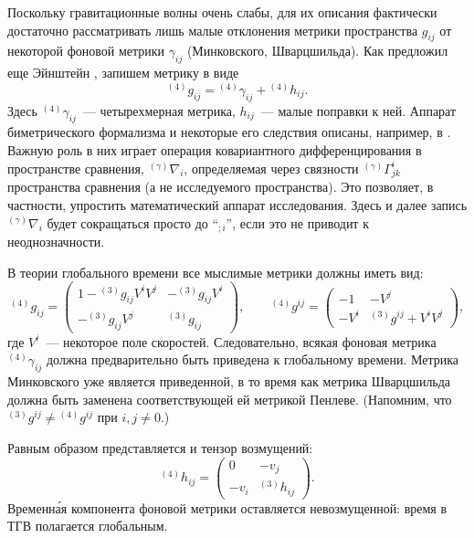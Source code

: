 \documentclass[\docroot/reports/draft/report.tex]{subfiles}
\begin{document}
    Поскольку гравитационные волны очень слабы, для их описания фактически достаточно рассматривать лишь малые отклонения метрики пространства $g_{ij}$ от некоторой фоновой метрики $\gamma_{ij}$ (Минковского, Шварцшильда). Как предложил еще Эйнштейн \cite{einstein_grav_waves}, запишем метрику в виде
    \begin{equation}\label{eq:gab}
        {}^{(4)}g_{ij} = {}^{(4)}\gamma_{ij} + {}^{(4)}h_{ij} .
    \end{equation}
    Здесь ${}^{(4)}\gamma_{ij}$~--- четырехмерная метрика, $h_{ij}$~--- малые поправки к ней. Аппарат биметрического формализма и некоторые его следствия описаны, например, в \cite{burlankov_jetp_covar_cosn}. Важную роль в них играет операция ковариантного дифференцирования в пространстве сравнения, ${}^{(\gamma)}\nabla_i$, определяемая через связности ${}^{(\gamma)}\Gamma^i_{jk}$ пространства сравнения (а не исследуемого пространства). Это позволяет, в частности, упростить математический аппарат исследования. Здесь и далее запись ${}^{(\gamma)}\nabla_i$ будет сокращаться просто до \enquote{${}_{;i}$}, если это не приводит к неоднозначности.

    В теории глобального времени все мыслимые метрики должны иметь вид:
    \begin{equation}
        {}^{(4)}g_{ij} = \begin{pmatrix}
            1 - {}^{(3)}g_{ij} V^i V^j   & - {}^{(3)}g_{ij} V^i \\
            - {}^{(3)}g_{ij} V^j         & {}^{(3)}g_{ij}
        \end{pmatrix} , \qquad
        {}^{(4)}g^{ij} = \begin{pmatrix}
            - 1   & - V^j                           \\
            - V^i & {}^{(3)}g^{ij} + V^i V^j
        \end{pmatrix} ,
    \end{equation}
    где $V^i$~--- некоторое поле скоростей. Следовательно, всякая фоновая метрика  ${}^{(4)}\gamma_{ij}$ должна предварительно быть приведена к глобальному времени. Метрика Минковского уже является приведенной, в то время как метрика Шварцшильда должна быть заменена соответствующей ей метрикой Пенлеве. (Напомним, что ${}^{(3)}g^{ij} \neq {}^{(4)}g^{ij}$ при $i,j \neq 0$.)

    Равным образом представляется и тензор возмущений:
    \begin{equation}
        {}^{(4)}h_{ij} = \begin{pmatrix}
            0    & - v_j          \\
            -v_i & {}^{(3)}h_{ij}
        \end{pmatrix} .
    \end{equation}
    Временн\'{а}я компонента фоновой метрики оставляется невозмущенной: время в ТГВ полагается глобальным.
\end{document}
